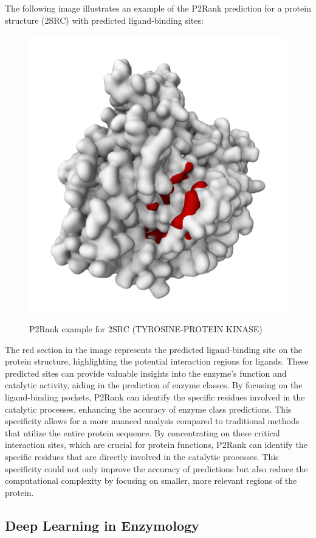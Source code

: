 The following image illustrates an example of the P2Rank prediction for a protein structure (2SRC) with predicted ligand-binding sites:

\begin{figure}[hbt]
    \centering
    \begin{minipage}[t]{\textwidth}
    \caption{P2Rank example for 2SRC (TYROSINE-PROTEIN KINASE)}
    \includegraphics[width=.5\textwidth]{img/p2rank-example.png}\\
    \label{fig:p2rank-example}
    \end{minipage}
\end{figure}

The red section in the image represents the predicted ligand-binding site on the protein structure, highlighting the potential interaction regions for ligands. These predicted sites can provide valuable insights into the enzyme's function and catalytic activity, aiding in the prediction of enzyme classes. By focusing on the ligand-binding pockets, P2Rank can identify the specific residues involved in the catalytic processes, enhancing the accuracy of enzyme class predictions. This specificity allows for a more nuanced analysis compared to traditional methods that utilize the entire protein sequence. By concentrating on these critical interaction sites, which are crucial for protein functions, P2Rank can identify the specific residues that are directly involved in the catalytic processes. This specificity could not only improve the accuracy of predictions but also reduce the computational complexity by focusing on smaller, more relevant regions of the protein.

\subsection{Deep Learning in Enzymology}
\label{sec:Deep Learning in Enzymology}

